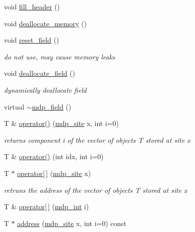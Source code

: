 \begin{DoxyCompactItemize}
void \hyperlink{classmdp__field_ad3ad6161829f9bf07fc4dd607d71e0ea}{fill\_\-header} ()
\item 
void \hyperlink{classmdp__field_a3c2b219b116a0bb1cb340c3e06c37657}{deallocate\_\-memory} ()
\item 
void \hyperlink{classmdp__field_aa581ac8278d31ed9dabbff2df49c7130}{reset\_\-field} ()
\begin{DoxyCompactList}\small\item\em do not use, may cause memory leaks \item\end{DoxyCompactList}\item 
void \hyperlink{classmdp__field_ab063254fe74b88b1c9cc9e0cbc843b4b}{deallocate\_\-field} ()
\begin{DoxyCompactList}\small\item\em dynamically deallocate field \item\end{DoxyCompactList}\item 
virtual \hyperlink{classmdp__field_a98c85b56205d56d48ff740abb5d5cbb8}{$\sim$mdp\_\-field} ()
\item 
T \& \hyperlink{classmdp__field_a9eec94ee723253a196ccc4677832b4a0}{operator()} (\hyperlink{classmdp__site}{mdp\_\-site} x, int i=0)
\begin{DoxyCompactList}\small\item\em returns component i of the vector of objects T stored at site x \item\end{DoxyCompactList}\item 
T \& \hyperlink{classmdp__field_ab99b7a328e1fa4be857fe72d180b0b35}{operator()} (int idx, int i=0)
\item 
T $\ast$ \hyperlink{classmdp__field_a7dab126ffc90476401048cdf747077ef}{operator\mbox{[}$\,$\mbox{]}} (\hyperlink{classmdp__site}{mdp\_\-site} x)
\begin{DoxyCompactList}\small\item\em retruns the address of the vector of objects T stored at site x \item\end{DoxyCompactList}\item 
T \& \hyperlink{classmdp__field_a97c56a74600b0d408ec24a161c4e8643}{operator\mbox{[}$\,$\mbox{]}} (\hyperlink{mdp__global__vars_8h_aaa1ad9d0dcd2124aa5af0120d9954174}{mdp\_\-int} i)
\item 
T $\ast$ \hyperlink{classmdp__field_ab2159a8078313482a60a08e6f3b81209}{address} (\hyperlink{classmdp__site}{mdp\_\-site} x, int i=0) const 

\end{DoxyCompactItemize}
